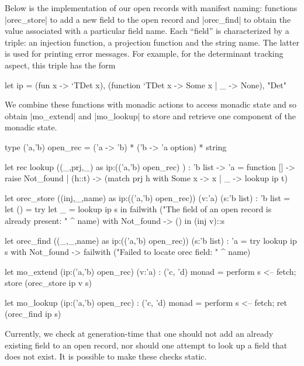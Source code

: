 \documentclass{elsart}
\begin{document}
Below is the implementation of our open records with manifest
naming: functions |orec_store| to add a new field to the open record
and |orec_find| to obtain the value associated with a particular field
name. Each ``field'' is characterized by a triple: an injection function, 
a projection function and the string name. The latter is used for 
printing error messages. For example, for the
determinant tracking aspect, this triple has the form
\begin{code}
let ip = 
  (fun x -> `TDet x), (function `TDet x -> Some x | _ -> None), "Det"
\end{code}
We combine these functions with monadic
actions to access monadic state and so obtain 
|mo_extend| and |mo_lookup| to store and retrieve one component 
of the monadic state.
\begin{code}
type ('a,'b) open_rec = ('a -> 'b) * ('b -> 'a option)  * string

let rec lookup ((_,prj,_) as ip:(('a,'b) open_rec) )
   : 'b list -> 'a = 
   function [] -> raise Not_found
   | (h::t) -> (match prj h with Some x -> x | _ -> lookup ip t)

let orec_store ((inj,_,name) as ip:(('a,'b) open_rec)) (v:'a) (s:'b list) 
   : 'b list =
  let () = 
    try let _ = lookup ip s in 
        failwith ("The field of an open record is already present: " ^ name)
    with Not_found -> () in
  (inj v)::s

let orec_find ((_,_,name) as ip:(('a,'b) open_rec)) (s:'b list) : 'a =
  try lookup ip s 
  with Not_found -> failwith ("Failed to locate orec field: " ^ name)

let mo_extend (ip:('a,'b) open_rec) (v:'a) : ('c, 'd) monad = 
  perform s <-- fetch; store (orec_store ip v s)

let mo_lookup (ip:('a,'b) open_rec) : ('c, 'd) monad =
  perform s <-- fetch; ret (orec_find ip s)
\end{code}
%
Currently, we check at generation-time that one should not add an
already existing field to an open record, nor should one attempt to
look up a field that does not exist. It is possible to make these
checks static.
\end{document}
